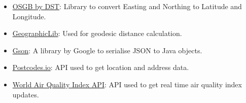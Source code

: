 \documentclass[10pt, a4paper]{scrartcl}
\begin{document}
\begin{multicols}{2}
\begin{itemize}
    \item \href{https://github.com/dstl/osgb}{OSGB by DST}: Library to convert Easting and Northing to
    Latitude and Longitude.

    \item \href{https://github.com/geographiclib/}{GeographicLib}: Used for geodesic distance calculation.

    \item \href{https://github.com/google/gson}{Gson}: A library by Google to serialise JSON to
    Java objects.

    \item \href{https://postcodes.io/}{Postcodes.io}: API used to get location and address data.

    \item \href{https://aqicn.org/api/}{World Air Quality Index API}: API used to get real time air quality index updates.
\end{itemize}
    
\end{multicols}
\end{document}
